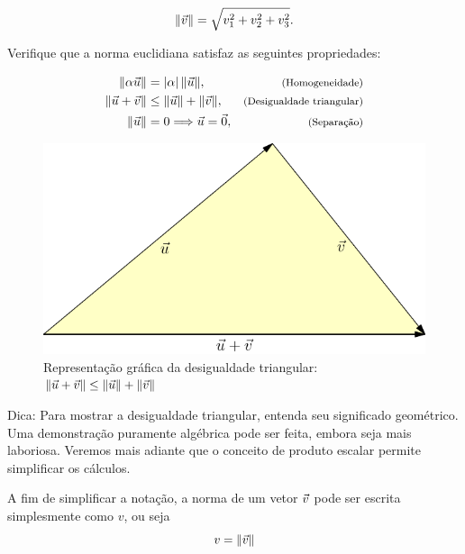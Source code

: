 \begin{equation}\label{defnorma}\|\vec{v}\|=\sqrt{v_1^2+v_2^2+v_3^2}.\end{equation}
\begin{prob}\label{exnorma}Verifique que a norma euclidiana satisfaz as seguintes propriedades:
  
\begin{subequations}\label{propnorma}
\begin{align}
\|\alpha \vec{u}\|&=|\alpha|~\!\|\vec{u}\|,&\hbox{\footnotesize (Homogeneidade)}\label{propnormahom}\\
\|\vec{u}+\vec{v}\|&\leq \|\vec{u}\|+\|\vec{v}\|,&\hbox{\footnotesize (Desigualdade triangular)}\label{propnormatri}\\
\|\vec{u}\|&=0 \Longrightarrow \vec{u}=\vec{0},&\hbox{\footnotesize (Separação)}\label{propnormasep}
\end{align}
\end{subequations}
\end{prob}

\begin{figure}%
 \includegraphics{./cap_algvet/pics/desigualdade_triangulo}
      \caption{Representação gráfica da desigualdade triangular: $\|\vec{u}+\vec{v}\|\leq \|\vec{u}\|+\|\vec{v}\|$}
      \label{fig:des_triang}
   \end{figure}

Dica: Para mostrar a desigualdade triangular, entenda seu significado geométrico. Uma demonstração puramente algébrica pode ser feita, embora seja mais laboriosa. Veremos mais adiante que o conceito de produto escalar permite simplificar os cálculos. 

A fim de simplificar a notação, a norma de um vetor $\vec{v}$ pode ser escrita simplesmente como $v$, ou seja
$$v=\|\vec{v}\|$$ 

